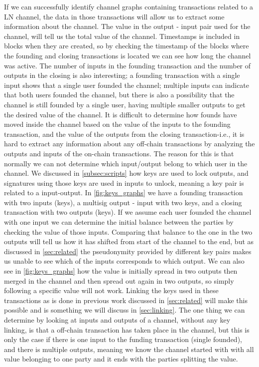 If we can successfully identify channel graphs containing transactions related to a LN channel, the data in those transactions will allow us to extract some information about the channel.
The value in the output - input pair used for the channel, will tell us the total value of the channel.
Timestamps is included in blocks when they are created, so by checking the timestamp of the blocks where the founding and closing transactions is located we can see how long the channel was active.
The number of inputs in the founding transaction and the number of outputs in the closing is also interesting; a founding transaction with a single input shows that a single user founded the channel; multiple inputs can indicate that both users founded the channel, but there is also a possibility that the channel is still founded by a single user, having multiple smaller outputs to get the desired value of the channel.
It is difficult to determine how founds have moved inside the channel based on the value of the inputs to the founding transaction, and the value of the outputs from the closing transaction-i.e., it is hard to extract any information about any off-chain transactions by analyzing the outputs and inputs of the on-chain transactions.
The reason for this is that normally we can not determine which input/output belong to which user in the channel.
We discussed in \cref{subsec:scripts} how keys are used to lock outputs, and signatures using those keys are used in inputs to unlock, meaning a key pair is related to a input-output.
In \cref{fig:keys_graphs} we have a founding transaction with two inputs (keys), a multisig output - input with two keys, and a closing transaction with two outputs (keys).
If we assume each user founded the channel with one input we can determine the initial balance between the parties by checking the value of those inputs.
Comparing that balance to the one in the two outputs will tell us how it has shifted from start of the channel to the end, but as discussed in \cref{sec:related} the pseudonymity provided by different key pairs makes us unable to see which of the inputs corresponds to which output.
We can also see in \cref{fig:keys_graphs} how the value is initially spread in two outputs then merged in the channel and then spread out again in two outputs, so simply following a specific value will not work.
Linking the keys used in these transactions as is done in previous work discussed in \cref{sec:related} will make this possible and is something we will discuss in \cref{sec:linking}.
The one thing we can determine by looking at inputs and outputs of a channel, without any key linking, is that a off-chain transaction has taken place in the channel, but this is only the case if there is one input to the funding transaction (single founded), and there is multiple outputs, meaning we know the channel started with with all value belonging to one party and it ends with the parties splitting the value.
\\

